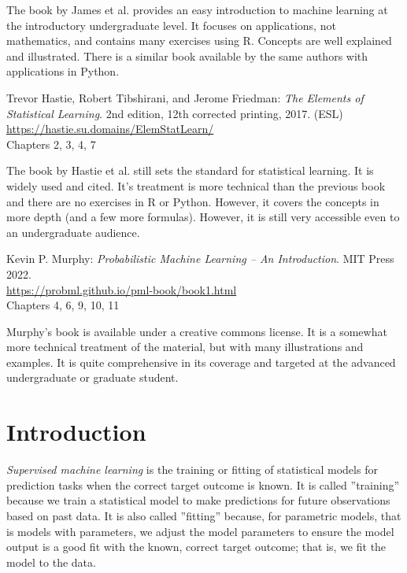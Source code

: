 The book by James et al. provides an easy introduction to machine learning at the introductory undergraduate level. It focuses on applications, not mathematics, and contains many exercises using R. Concepts are well explained and illustrated. There is a similar book available by the same authors with applications in Python. 

\begin{resourcebox}
Trevor Hastie, Robert Tibshirani, and Jerome Friedman: \emph{The Elements of Statistical Learning}. 2nd edition, 12th corrected printing, 2017. (ESL) \\

\url{https://hastie.su.domains/ElemStatLearn/} \\

Chapters 2, 3, 4, 7
\end{resourcebox}

The book by Hastie et al. still sets the standard for statistical learning. It is widely used and cited. It's treatment is more technical than the previous book and there are no exercises in R or Python. However, it covers the concepts in more depth (and a few more formulas). However, it is still very accessible even to an undergraduate audience.

\begin{resourcebox}
Kevin P. Murphy: \emph{Probabilistic Machine Learning -- An Introduction}. MIT Press 2022. \\

\url{https://probml.github.io/pml-book/book1.html} \\

Chapters 4, 6, 9, 10, 11
\end{resourcebox}

Murphy's book is available under a creative commons license. It is a somewhat more technical treatment of the material, but with many illustrations and examples. It is quite comprehensive in its coverage and targeted at the advanced undergraduate or graduate student. 

\section{Introduction}

\emph{Supervised machine learning} is the training or fitting of statistical models for prediction tasks when the correct target outcome is known. It is called ''training'' because we train a statistical model to make predictions for future observations based on past data. It is also called ''fitting'' because, for parametric models, that is models with parameters, we adjust the model parameters to ensure the model output is a good fit with the known, correct target outcome; that is, we fit the model to the data. 

